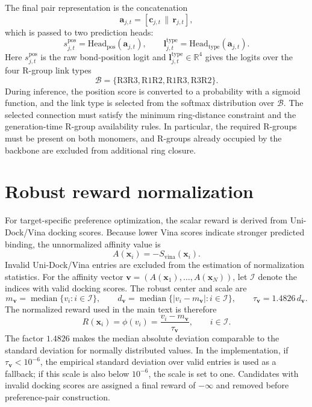 \documentclass[12pt]{article}
\begin{document}
The final pair representation is the concatenation
\begin{equation}
\mathbf{a}_{j,t} = [\mathbf{c}_{j,t}\,\|\,\mathbf{r}_{j,t}],
\label{eq:sup_ring_pair}
\end{equation}
which is passed to two prediction heads:
\begin{equation}
s_{j,t}^{\mathrm{pos}}
=
\mathrm{Head}_{\mathrm{pos}}(\mathbf{a}_{j,t}),
\qquad
\mathbf{l}_{j,t}^{\mathrm{type}}
=
\mathrm{Head}_{\mathrm{type}}(\mathbf{a}_{j,t}).
\label{eq:sup_ring_heads}
\end{equation}
Here $s_{j,t}^{\mathrm{pos}}$ is the raw bond-position logit and $\mathbf{l}_{j,t}^{\mathrm{type}}\in\mathbb{R}^{4}$ gives the logits over the four R-group link types
\[
\mathcal{B}=\{\mathrm{R3R3},\mathrm{R1R2},\mathrm{R1R3},\mathrm{R3R2}\}.
\]
During inference, the position score is converted to a probability with a sigmoid function, and the link type is selected from the softmax distribution over $\mathcal{B}$.
The selected connection must satisfy the minimum ring-distance constraint and the generation-time R-group availability rules.
In particular, the required R-groups must be present on both monomers, and R-groups already occupied by the backbone are excluded from additional ring closure.

\section{Robust reward normalization}

For target-specific preference optimization, the scalar reward is derived from Uni-Dock/Vina docking scores.
Because lower Vina scores indicate stronger predicted binding, the unnormalized affinity value is
\begin{equation}
A(\mathbf{x}_i)=-S_{\mathrm{vina}}(\mathbf{x}_i).
\label{eq:sup_vina_affinity}
\end{equation}
Invalid Uni-Dock/Vina entries are excluded from the estimation of normalization statistics.
For the affinity vector $\mathbf{v}=(A(\mathbf{x}_1),\ldots,A(\mathbf{x}_N))$, let $\mathcal{I}$ denote the indices with valid docking scores.
The robust center and scale are
\begin{equation}
m_{\mathbf{v}}
=\operatorname{median}\{v_i:i\in\mathcal{I}\},
\qquad
d_{\mathbf{v}}
=\operatorname{median}\{|v_i-m_{\mathbf{v}}|:i\in\mathcal{I}\},
\qquad
\tau_{\mathbf{v}}=1.4826\,d_{\mathbf{v}}.
\label{eq:sup_robust_stats}
\end{equation}
The normalized reward used in the main text is therefore
\begin{equation}
R(\mathbf{x}_i)=\phi(v_i)=\frac{v_i-m_{\mathbf{v}}}{\tau_{\mathbf{v}}},
\qquad i\in\mathcal{I}.
\label{eq:sup_robust_phi}
\end{equation}
The factor $1.4826$ makes the median absolute deviation comparable to the standard deviation for normally distributed values.
In the implementation, if $\tau_{\mathbf{v}}<10^{-6}$, the empirical standard deviation over valid entries is used as a fallback; if this scale is also below $10^{-6}$, the scale is set to one.
Candidates with invalid docking scores are assigned a final reward of $-\infty$ and removed before preference-pair construction.
\end{document}

